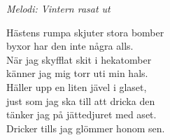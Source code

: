 {\footnotesize\textit{Melodi: Vintern rasat ut}}\par
\vspace{10pt}
Hästens rumpa skjuter stora bomber\\
byxor har den inte några alls.\\
När jag skyfflat skit i hekatomber\\
känner jag mig torr uti min hals.\\
Häller upp en liten jävel i glaset,\\
just som jag ska till att dricka den\\
tänker jag på jättedjuret med aset.\\
Dricker tills jag glömmer honom sen.
